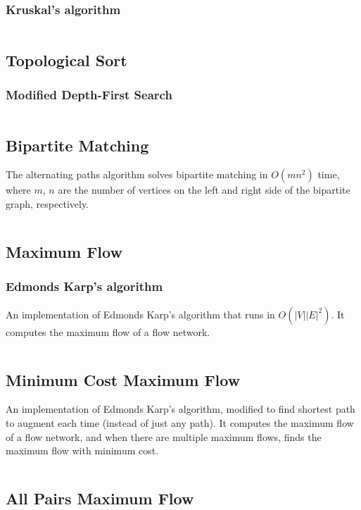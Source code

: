\documentclass[8pt,a4paper]{amsart}
\newcommand{\code}[1]{\inputminted[linenos]{cpp}{_code/#1}}
\begin{document}
        \subsubsection{Kruskal's algorithm}
            \code{graph/kruskals_mst.cpp}

    \subsection{Topological Sort}
        \subsubsection{Modified Depth-First Search}
            \code{graph/tsort.cpp}

    \subsection{Bipartite Matching}
        The alternating paths algorithm solves bipartite matching in $O(mn^2)$
        time, where $m$, $n$ are the number of vertices on the left and right
        side of the bipartite graph, respectively.
        \code{graph/bipartite_matching.cpp}

    \subsection{Maximum Flow}
        \subsubsection{Edmonds Karp's algorithm}
            An implementation of Edmonds Karp's algorithm that runs in
            $O(|V||E|^2)$. It computes the maximum flow of a flow network.
            \code{graph/edmonds_karps.cpp}

    \subsection{Minimum Cost Maximum Flow}
        An implementation of Edmonds Karp's algorithm, modified to find
        shortest path to augment each time (instead of just any path). It
        computes the maximum flow of a flow network, and when there are
        multiple maximum flows, finds the maximum flow with minimum cost.
        \code{graph/edmonds_karps_mcmf.cpp}

    \subsection{All Pairs Maximum Flow}
\end{document}
